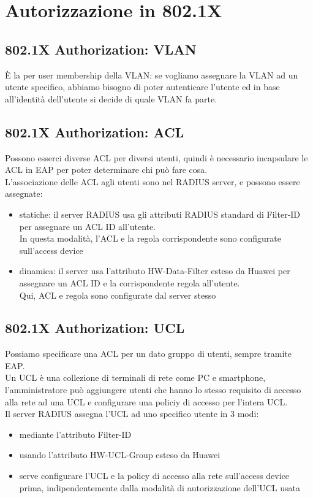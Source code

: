 \documentclass[12pt, oneside]{extbook} %
\begin{document}
\section{Autorizzazione in 802.1X}
\subsection{802.1X Authorization: VLAN}
È la per user membership della VLAN: se vogliamo assegnare la VLAN ad un utente specifico, abbiamo bisogno di poter autenticare l'utente ed in base all'identità dell'utente si decide di quale VLAN fa parte.
\\

\subsection{802.1X Authorization: ACL}
Possono esserci diverse ACL per diversi utenti, quindi è necessario incapsulare le ACL in EAP per poter determinare chi può fare cosa.
\\L'associazione delle ACL agli utenti sono nel RADIUS server, e possono essere assegnate:
    \begin{itemize}
        \item statiche: il server RADIUS usa gli attributi RADIUS standard di Filter-ID per assegnare un ACL ID all'utente.
        \\In questa modalità, l'ACL e la regola corrispondente sono configurate sull'access device
        \item dinamica: il server usa l'attributo HW-Data-Filter esteso da Huawei per assegnare un ACL ID e la corrispondente regola all'utente.
        \\Qui, ACL e regola sono configurate dal server stesso
    \end{itemize}

\subsection{802.1X Authorization: UCL}
Possiamo specificare una ACL per un dato gruppo di utenti, sempre tramite EAP.
\\Un UCL è una collezione di terminali di rete come PC e smartphone, l'amministratore può aggiungere utenti che hanno lo stesso requisito di accesso alla rete ad una UCL e configurare una policiy di accesso per l'intera UCL.
\\Il server RADIUS assegna l'UCL ad uno specifico utente in 3 modi:
    \begin{itemize}
        \item mediante l'attributo Filter-ID
        \item usando l'attributo HW-UCL-Group esteso da Huawei
        \item serve configurare l'UCL e la policy di accesso alla rete sull'access device prima, indipendentemente dalla modalità di autorizzazione dell'UCL usata
    \end{itemize}
\end{document}
